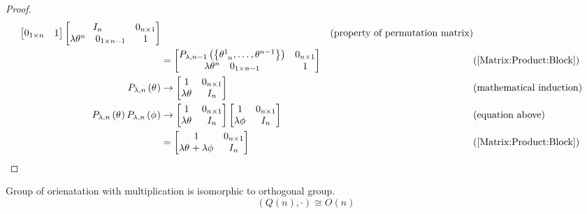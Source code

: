 \documentclass[../main.tex]{subfiles}
\begin{document}
\begin{proof}
\begin{align*}
\begin{bmatrix}
0_{1\times n}&1\\
\end{bmatrix}
\begin{bmatrix}
{I}_{n}&0_{n\times1}\\
\begin{matrix*}\lambda\tensor{\theta}{^n}&0_{1\times n-1}\end{matrix*}&1\\
\end{bmatrix}&&\text{(property of permutation matrix)}\\
&=
\begin{bmatrix}
P_{\lambda,n-1}\left(\left\{\tensor{\theta}{^1_{n}},\dots,\tensor{\theta}{^{n-1}}\right\}\right)&0_{n\times1}\\
\begin{matrix*}\lambda\tensor{\theta}{^n}&0_{1\times n-1}\end{matrix*}&1\\
\end{bmatrix}&&\text{(\cref{Matrix:Product:Block})}\\
P_{\lambda,n}\left(\tensor{\theta}{}\right)
&\to
\begin{bmatrix}
1&0_{n\times1}\\
\lambda\tensor{\theta}{}&I_n\\
\end{bmatrix}&&\text{(mathematical induction)}\\
P_{\lambda,n}\left(\tensor{\theta}{}\right) P_{\lambda,n}\left(\tensor{\phi}{}\right)
&\to
\begin{bmatrix}
1&0_{n\times1}\\
\lambda\tensor{\theta}{}&I_n\\
\end{bmatrix}\begin{bmatrix}
1&0_{n\times1}\\
\lambda\tensor{\phi}{}&I_n\\
\end{bmatrix}&&\text{(equation above)}\\
&=
\begin{bmatrix}
1&0_{n\times1}\\
\lambda\tensor{\theta}{}+\lambda\tensor{\phi}{}&I_n\\
\end{bmatrix}&&\text{(\cref{Matrix:Product:Block})}
\end{align*}
\end{proof}
\begin{proposition}
Group of orienatation with multiplication is isomorphic to orthogonal group.
\begin{equation*}
\left(Q\left(n\right),\cdot\right)\cong O\left(n\right)
\end{equation*}
\end{proposition}
\end{document}
